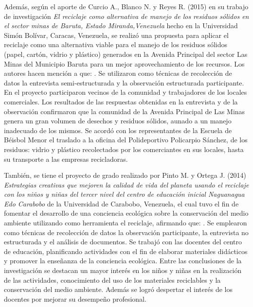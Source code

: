 Además, según el aporte de Curcio A., Blanco N. y Reyes R. (2015) en su trabajo de investigación \textit{El reciclaje como alternativa de manejo de los residuos sólidos en el sector minas de Baruta, Estado Miranda,Venezuela} hecho en la Universidad Simón Bolívar, Caracas, Venezuela, se realizó una propuesta para aplicar el reciclaje como una alternativa viable para el manejo de los residuos sólidos (papel, cartón, vidrio y plástico) generados en la Avenida Principal del sector Las Minas del Municipio Baruta para un mejor aprovechamiento de los recursos. Los autores hacen mención a que: . Se utilizaron como técnicas de recolección de datos la entrevista semi-estructurada y la observación estructurada participante. En el proyecto participaron vecinos de la comunidad y trabajadores de los locales comerciales. Los resultados de las respuestas obtenidas en la entrevista y de la observación confirmaron que la comunidad de la Avenida Principal de Las Minas genera un gran volumen de desechos y residuos sólidos, aunado a un manejo inadecuado de los mismos. Se acordó con los representantes de la Escuela de Béisbol Menor  el traslado a la oficina del Polideportivo Policarpio Sánchez, de los residuos: vidrio y plástico recolectados por los comerciantes en sus locales, hasta su transporte a las empresas recicladoras. 

También, se tiene el proyecto de grado realizado por Pinto M. y Ortega J. (2014) \textit{Estrategias creativas que mejoren la calidad de vida del planeta usando el reciclaje con los niños y niñas del tercer nivel del centro de educación inicial  Naguanagua Edo Carabobo} de la Universidad de Carabobo, Venezuela, el cual tuvo el fin de fomentar el desarrollo de una conciencia ecológica sobre la conservación del medio ambiente utilizando como herramienta el reciclaje, afirmando que: . Se emplearon como técnicas de recolección de datos la observación participante, la entrevista no estructurada y el análisis de documentos. Se trabajó con las docentes del centro de educación, planificando actividades con el fin de elaborar materiales didácticos y promover la enseñanza de la conciencia ecológica. Entre las conclusiones de la investigación se destacan un mayor interés en los niños y niñas en la realización de las actividades, conocimiento del uso de los materiales reciclables y la conservación del medio ambiente. Además se logró despertar el interés de los docentes por mejorar su desempeño profesional.  

